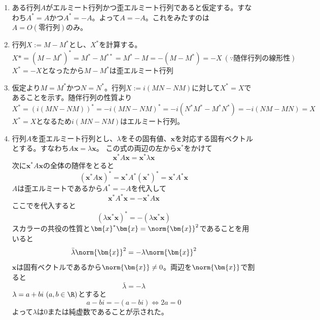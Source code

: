 \begin{souanswer}
\begin{enumerate}
\begin{equation}
\end{equation}
	が成り立つ。ここで$a_{kk}= x+ yi\ (x, y\in \R)$とすると
\begin{equation*}
	\bar{a_{kk}}= x- yi
\end{equation*}
	に代入すると
\begin{equation*}
	x- yi= -(x- yi)\Leftrightarrow 2x= 0\Leftrightarrow x= 0
\end{equation*}
	よって$a_{kk}= yi$となる。$y\ne 0$のときは純虚数となるため、対角成分は0または純虚数となる。
	\item ある行列$A$がエルミート行列かつ歪エルミート行列であると仮定する。すなわち$A^*= A$かつ$A^*= -A$。よって$A= -A$。これをみたすのは$A= O(零行列)$のみ。
	\item 行列$X:= M- M^*$とし、$X^*$を計算する。
\begin{equation*}
	X*= (M- M^*)^*= M^*- M^{**}= M^* -M= -(M- M^*)= -X\ (\because 随伴行列の線形性)
\end{equation*}
	$X^*= -X$となったから$M- M^*$は歪エルミート行列
	\item 仮定より$M= M^*$かつ$N= N^*$。行列$X:= i(MN- NM)$に対して$X^*= X$であることを示す。随伴行列の性質より
\begin{equation*}
	X^*= (i(MN- NM))^*= -i(MN- NM)^*= -i(N^*M^*- M^*N^*)= -i(NM- MN)= X
\end{equation*}
	$X^*= X$となるため$i(MN- NM)$はエルミート行列。
	\item 行列$A$を歪エルミート行列とし、$\lambda$をその固有値、$\bm{x}$を対応する固有ベクトルとする。すなわち$A\bm{x}= \lambda\bm{x}$。
	この式の両辺の左から$\bm{x}^*$をかけて
\begin{equation} \label{R8_3rd_2(5)_reration}
	\bm{x}^*A\bm{x}= \bm{x}^*\lambda\bm{x}
\end{equation}
	次に$\bm{x}^*A\bm{x}$の全体の随伴をとると
\begin{equation*}
	(\bm{x}^*A\bm{x})^*= \bm{x}^*A^*(\bm{x}^*)^*= \bm{x}^*A^*\bm{x}
\end{equation*}
	$A$は歪エルミートであるから$A^*= -A$を代入して
\begin{equation*}
	\bm{x}^*A^*\bm{x}= -\bm{x}^*A\bm{x}
\end{equation*}
	ここでを代入すると
\begin{equation*}
	(\lambda\bm{x}^*\bm{x})^*= -(\lambda\bm{x}^*\bm{x})
\end{equation*}
	スカラーの共役の性質と$\bm{x}^*\bm{x}= \norm{\bm{x}}^2$であることを用いると
\begin{equation*}
	\bar{\lambda}\norm{\bm{x}}^2= -\lambda\norm{\bm{x}}^2
\end{equation*}
	$\bm{x}$は固有ベクトルであるから$\norm{\bm{x}}\ne 0$。両辺を$\norm{\bm{x}}$で割ると
\begin{equation*}
	\bar{\lambda}= -\lambda
\end{equation*}
	$\lambda= a+ bi\ (a, b\in \R)$とすると
\begin{equation*}
	a- bi= -(a- bi)\Leftrightarrow 2a= 0
\end{equation*}
	よって$\lambda$は0または純虚数であることが示された。
\end{enumerate}
\end{souanswer}
